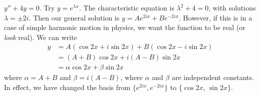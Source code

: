 \documentclass[a4paper]{article}
\begin{document}
\begin{eg}
  $y'' + 4y = 0$. Try $y = e^{\lambda x}$. The characteristic equation is $\lambda^2 + 4 = 0$, with solutions $\lambda = \pm 2i$. Then our general solution is $y = Ae^{2ix} + Be^{-2ix}$. However, if this is in a case of simple harmonic motion in physics, we want the function to be real (or \emph{look} real). We can write
  \begin{align*}
    y &= A(\cos 2x + i\sin 2x) + B(\cos 2x - i\sin 2x)\\
    &= (A + B)\cos 2x + i(A - B)\sin 2x\\
    &= \alpha\cos 2x + \beta\sin 2x
  \end{align*}
where $\alpha = A + B$ and $\beta = i(A - B)$, where $\alpha$ and $\beta$ are independent constants.
\note In effect, we have changed the basis from $\{e^{2ix}, e^{-2ix}\}$ to $\{\cos 2x$, $\sin 2x\}$.
\end{eg}
\end{document}
